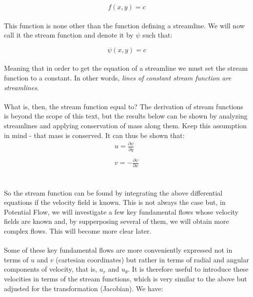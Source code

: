 \documentclass[11pt]{article}
\begin{document}
\begin{equation*}
    f(x,y) = c
\end{equation*} \\
\noindent
This function is none other than the function defining a streamline. We will now call it the stream function and denote it by $\psi$ such that:

\begin{equation*}
    \psi(x,y) = c
\end{equation*} \\
\noindent
Meaning that in order to get the equation of a streamline we must set the stream function to a constant. In other words, \emph{lines of constant stream function are streamlines}.\\ \\
\noindent
What is, then, the stream function equal to? The derivation of stream functions is beyond the scope of this text, but the results below can be shown by analyzing streamlines and applying conservation of mass along them. Keep this assumption in mind - that mass is conserved. It can thus be shown that: \\

\begin{equation}\label{streamfunctions}
    \begin{matrix}
        u = \frac{\partial \psi}{\partial y} \\ \\
        v = -\frac{\partial \psi}{\partial x}
    \end{matrix}
\end{equation}\\ \\
\noindent
So the stream function can be found by integrating the above differential equations if the velocity field is known. This is not always the case but, in Potential Flow, we will investigate a few key fundamental flows whose velocity fields are known and, by supperposing several of them, we will obtain more complex flows. This will become more clear later.\\ \\
\noindent
Some of these key fundamental flows are more conveniently expressed not in terms of $u$ and $v$ (cartesian coordinates) but rather in terms of radial and angular components of velocity, that is, $u_r$ and $u_\theta$. It is therefore useful to introduce these velocities in terms of the stream functions, which is very similar to the above but adjusted for the transformation (Jacobian). We have:
\end{document}
